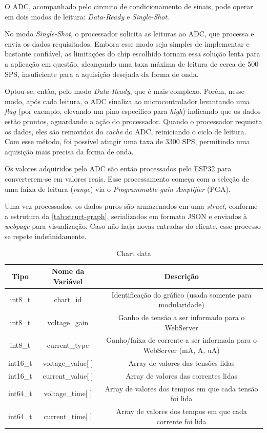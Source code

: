 O \gls{ADC}, acompanhado pelo circuito de condicionamento de sinais, pode operar em dois modos de leitura: \textit{Data-Ready} e \textit{Single-Shot}.

No modo \textit{Single-Shot}, o processador solicita as leituras ao \gls{ADC}, que processa e envia os dados requisitados. Embora esse modo seja simples de implementar e bastante confiável, as limitações do chip escolhido tornam essa solução lenta para a aplicação em questão, alcançando uma taxa máxima de leitura de cerca de 500 \gls{SPS}, insuficiente para a aquisição desejada da forma de onda.

Optou-se, então, pelo modo \textit{Data-Ready}, que é mais complexo. Porém, nesse modo, após cada leitura, o \gls{ADC} sinaliza ao microcontrolador levantando uma \textit{flag} (por exemplo, elevando um pino específico para \textit{high}) indicando que os dados estão prontos, aguardando a ação do processador. Quando o processador requisita os dados, eles são removidos do \textit{cache} do \gls{ADC}, reiniciando o ciclo de leitura. Com esse método, foi possível atingir uma taxa de 3300 \gls{SPS}, permitindo uma aquisição mais precisa da forma de onda.

Os valores adquiridos pelo \gls{ADC} são então processados pelo ESP32 para converterem-se em valores reais. Esse processamento começa com a seleção de uma faixa de leitura (\textit{range}) via o \textit{Programmable-gain Amplifier} (\gls{PGA}).

Uma vez processados, os dados puros são armazenados em uma \textit{struct}, conforme a estrutura da \autoref{tab:struct-graph}, serializados em formato JSON e enviados à \textit{webpage} para visualização. Caso não haja novas entradas do cliente, esse processo se repete indefinidamente.

\begin{table}[h!]
\centering
\caption{Chart data}
\vspace*{5mm}
\begin{tabular}{ c c c }
    \hline
    \textbf{Tipo} & \textbf{Nome da Variável} & \textbf{Descrição} \\ \hline
    int8\_t & chart\_id & Identificação do gráfico (usada somente para modularidade) \\ \hline
    int8\_t & voltage\_gain & Ganho de tensão a ser informado para o WebServer \\ \hline
    int8\_t & current\_type & Ganho/faixa de corrente a ser informada para o WebServer (mA, A, uA) \\ \hline
    int16\_t & voltage\_value[ ] & Array de valores das tensões lidas \\ \hline
    int16\_t & current\_value[ ] & Array de valores das correntes lidas \\ \hline
    int64\_t & voltage\_time[ ] & Array de valores dos tempos em que cada tensão foi lida \\ \hline
    int64\_t & current\_time[ ] & Array de valores dos tempos em que cada corrente foi lida \\ \hline
\end{tabular}
\label{tab:struct-graph}
\fonte{}
\end{table}

